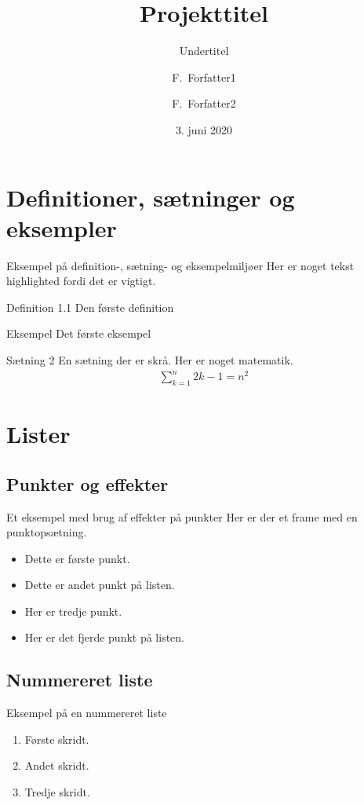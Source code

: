 \documentclass[9pt]{beamer}
\title[P2 Eksamen]{Projekttitel}
\subtitle{Undertitel}
\author[Forfatter1, Forfatter2]{F.~Forfatter1 \and F.~Forfatter2}
\date[2020]{3. juni 2020}
\begin{document}
\frame{\titlepage}



\section{Definitioner, sætninger og eksempler}
\begin{frame}{Eksempel på definition-, sætning- og eksempelmiljøer}
	Her er noget tekst
	\alert{highlighted}
	fordi det er vigtigt.

	\begin{defn}{Definition 1.1}
		Den første definition
	\end{defn}
	
	\begin{exmp}{Eksempel}
		Det første eksempel
	\end{exmp}

	\begin{thm}{Sætning 2}
		En sætning der er skrå.
		Her er noget matematik.
		\begin{align}
			\sum_{k=1}^n 2k-1 = n^2
		\end{align}
	\end{thm}
\end{frame}

\section{Lister}

\subsection{Punkter og effekter}
\begin{frame}{Et eksempel med brug af effekter på punkter}
	Her er der et frame med en punktopsætning.
	\begin{itemize} %
		\item<1-> Dette er første punkt.
		\item<2-> Dette er andet punkt på listen.
		\item<3-> Her er tredje punkt.
		\item<4-> Her er det fjerde punkt på listen.
	\end{itemize}
\end{frame}

\subsection{Nummereret liste}
\begin{frame}{Eksempel på en nummereret liste}
	\begin{enumerate}
		\item Første skridt.
		\item Andet skridt.
		\item Tredje skridt.
	\end{enumerate}
\end{frame}
\end{document}
